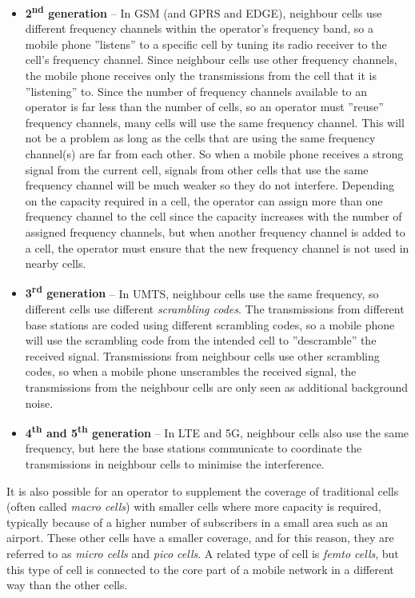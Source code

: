 \begin{itemize}
%
\item\textbf{2\textsuperscript{nd} generation} -- In GSM (and GPRS and EDGE), neighbour cells use different frequency channels within the operator's frequency band, so a mobile phone ''listens'' to a specific cell by tuning its radio receiver to the cell's frequency channel. Since neighbour cells use other frequency channels, the mobile phone receives only the transmissions from the cell that it is ''listening'' to. Since the number of frequency channels available to an operator is far less than the number of cells, so an operator must ''reuse'' frequency channels, \ie many cells will use the same frequency channel. This will not be a problem as long as the cells that are using the same frequency channel(s) are far from each other. So when a mobile phone receives a strong signal from the current cell, signals from other cells that use the same frequency channel will be much weaker so they do not interfere.  Depending on the capacity required in a cell, the operator can assign more than one frequency channel to the cell since the capacity increases with the number of assigned frequency channels, but when another frequency channel is added to a cell, the operator must ensure that the new frequency channel is not used in nearby cells.
%
\item\textbf{3\textsuperscript{rd} generation} -- In UMTS, neighbour cells use the same frequency, so different cells use different \emph{scrambling codes}. The transmissions from different base stations are coded using different scrambling codes, so a mobile phone will use the scrambling code from the intended cell to ''descramble'' the received signal. Transmissions from neighbour cells use other scrambling codes, so when a mobile phone unscrambles the received signal, the transmissions from the neighbour cells are only seen as additional background noise.
%
\item\textbf{4\textsuperscript{th} and 5\textsuperscript{th} generation} -- In LTE and 5G, neighbour cells also use the same frequency, but here the base stations communicate to coordinate the transmissions in neighbour cells to minimise the interference.
\end{itemize}

It is also possible for an operator to supplement the coverage of traditional cells (often called \emph{macro cells}) with smaller cells where more capacity is required, typically because of a higher number of subscribers in a small area such as an airport. These other cells have a smaller coverage, and for this reason, they are referred to as \emph{micro cells} and \emph{pico cells}. A related type of cell is \emph{femto cells}, but this type of cell is connected to the core part of a mobile network in a different way than the other cells.

